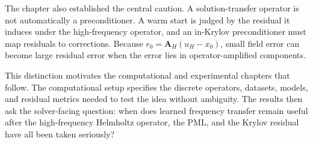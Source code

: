 The chapter also established the central caution. A solution-transfer operator
is not automatically a preconditioner. A warm start is judged by the residual
it induces under the high-frequency operator, and an in-Krylov preconditioner
must map residuals to corrections. Because
$r_0=\mathbf{A}_H(u_H-x_0)$, small field error can become large residual error
when the error lies in operator-amplified components.

This distinction motivates the computational and experimental chapters that
follow. The computational setup specifies the discrete operators, datasets,
models, and residual metrics needed to test the idea without ambiguity. The
results then ask the solver-facing question: when does learned frequency
transfer remain useful after the high-frequency Helmholtz operator, the PML,
and the Krylov residual have all been taken seriously?

%
%
%
%
%
%
%
%
